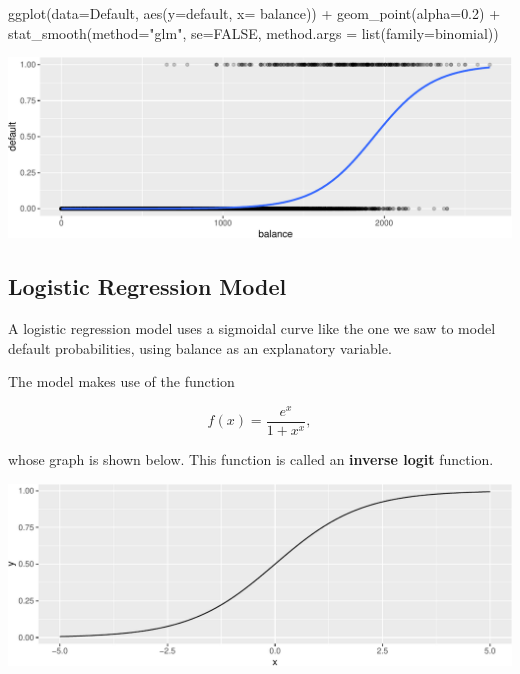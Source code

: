 \documentclass[
  letterpaper,
  DIV=11,
  numbers=noendperiod]{scrreprt}
\newenvironment{Shaded}{\begin{snugshade}}{\end{snugshade}}
\newcommand{\AttributeTok}[1]{\textcolor[rgb]{0.40,0.45,0.13}{#1}}
\newcommand{\ConstantTok}[1]{\textcolor[rgb]{0.56,0.35,0.01}{#1}}
\newcommand{\FloatTok}[1]{\textcolor[rgb]{0.68,0.00,0.00}{#1}}
\newcommand{\FunctionTok}[1]{\textcolor[rgb]{0.28,0.35,0.67}{#1}}
\newcommand{\NormalTok}[1]{\textcolor[rgb]{0.00,0.23,0.31}{#1}}
\newcommand{\SpecialCharTok}[1]{\textcolor[rgb]{0.37,0.37,0.37}{#1}}
\newcommand{\StringTok}[1]{\textcolor[rgb]{0.13,0.47,0.30}{#1}}
\begin{document}
\begin{Shaded}
\begin{Highlighting}[]
\FunctionTok{ggplot}\NormalTok{(}\AttributeTok{data=}\NormalTok{Default, }\FunctionTok{aes}\NormalTok{(}\AttributeTok{y=}\NormalTok{default, }\AttributeTok{x=}\NormalTok{ balance)) }\SpecialCharTok{+} \FunctionTok{geom\_point}\NormalTok{(}\AttributeTok{alpha=}\FloatTok{0.2}\NormalTok{) }\SpecialCharTok{+} 
  \FunctionTok{stat\_smooth}\NormalTok{(}\AttributeTok{method=}\StringTok{"glm"}\NormalTok{, }\AttributeTok{se=}\ConstantTok{FALSE}\NormalTok{, }\AttributeTok{method.args =} \FunctionTok{list}\NormalTok{(}\AttributeTok{family=}\NormalTok{binomial)) }
\end{Highlighting}
\end{Shaded}

\includegraphics{Ch6_files/figure-pdf/unnamed-chunk-7-1.pdf}

\subsection{Logistic Regression Model}\label{logistic-regression-model}

A logistic regression model uses a sigmoidal curve like the one we saw
to model default probabilities, using balance as an explanatory
variable.

The model makes use of the function

\[ f(x) = \frac{e^x}{1+x^x}, \]

whose graph is shown below. This function is called an \textbf{inverse
logit} function.

\includegraphics{Ch6_files/figure-pdf/unnamed-chunk-8-1.pdf}
\end{document}
